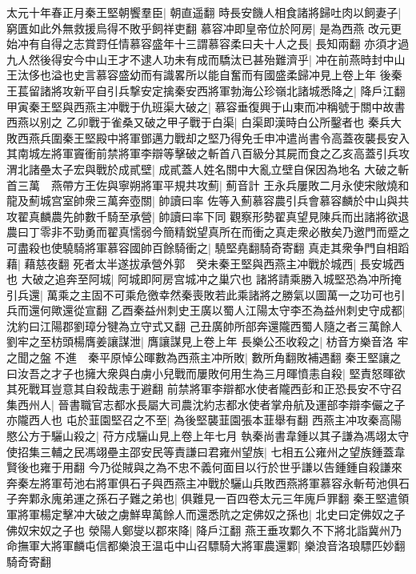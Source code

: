 太元十年春正月秦王堅朝饗羣臣|{
	朝直遥翻}
時長安饑人相食諸將歸吐肉以飼妻子|{
	窮匱如此外無救援烏得不敗乎飼祥吏翻}
慕容冲即皇帝位於阿房|{
	是為西燕}
改元更始冲有自得之志賞罸任情慕容盛年十三謂慕容柔曰夫十人之長|{
	長知兩翻}
亦須才過九人然後得安今中山王才不逮人功未有成而驕汰已甚殆難濟乎|{
	冲在前燕時封中山王汰侈也溢也史言慕容盛幼而有識畧所以能自奮而有國盛柔歸冲見上卷上年}
後秦王萇留諸將攻新平自引兵撃安定擒秦安西將軍勃海公珍嶺北諸城悉降之|{
	降戶江翻}
甲寅秦王堅與西燕主冲戰于仇班渠大破之|{
	慕容垂復興于山東而冲稱號于關中故書西燕以别之}
乙卯戰于雀桑又破之甲子戰于白渠|{
	白渠即漢時白公所鑿者也}
秦兵大敗西燕兵圍秦王堅殿中將軍鄧邁力戰却之堅乃得免壬申冲遣尚書令高蓋夜襲長安入其南城左將軍竇衝前禁將軍李辯等擊破之斬首八百級分其屍而食之乙亥高蓋引兵攻渭北諸壘太子宏與戰於成貳壁|{
	成貳蓋人姓名關中大亂立壁自保因為地名}
大破之斬首三萬　燕帶方王佐與寧朔將軍平規共攻薊|{
	薊音計}
王永兵屢敗二月永使宋敞燒和龍及薊城宫室帥衆三萬奔壺關|{
	帥讀曰率}
佐等入薊慕容農引兵會慕容麟於中山與共攻翟真麟農先帥數千騎至承營|{
	帥讀曰率下同}
觀察形勢翟真望見陳兵而出諸將欲退農曰丁零非不勁勇而翟真懦弱今簡精鋭望真所在而衝之真走衆必散矣乃邀門而蹙之可盡殺也使驍騎將軍慕容國帥百餘騎衝之|{
	驍堅堯翻騎奇寄翻}
真走其衆争門自相蹈藉|{
	藉慈夜翻}
死者太半遂拔承營外郭　癸未秦王堅與西燕主冲戰於城西|{
	長安城西也}
大破之追奔至阿城|{
	阿城即阿房宫城冲之巢穴也}
諸將請乘勝入城堅恐為冲所掩引兵還|{
	萬乘之主固不可乘危徼幸然秦喪敗若此乘諸將之勝氣以圖萬一之功可也引兵而還何歟還從宣翻}
乙酉秦益州刺史王廣以蜀人江陽太守李丕為益州刺史守成都|{
	沈約曰江陽郡劉璋分犍為立守式又翻}
己丑廣帥所部奔還隴西蜀人隨之者三萬餘人　劉牢之至枋頭楊膺姜讓謀泄|{
	膺讓謀見上卷上年}
長樂公丕收殺之|{
	枋音方樂音洛}
牢之聞之盤不進　秦平原悼公暉數為西燕主冲所敗|{
	數所角翻敗補遇翻}
秦王堅讓之曰汝吾之才子也擁大衆與白虜小兒戰而屢敗何用生為三月暉憤恚自殺|{
	堅責怒暉欲其死戰耳豈意其自殺哉恚于避翻}
前禁將軍李辯都水使者隴西彭和正恐長安不守召集西州人|{
	晉書職官志都水長屬大司農沈約志都水使者掌舟航及運部李辯李儼之子亦隴西人也}
屯於韮園堅召之不至|{
	為後堅襲韮園張本韮舉有翻}
西燕主冲攻秦高陽愍公方于驪山殺之|{
	苻方戍驪山見上卷上年七月}
執秦尚書韋鍾以其子謙為馮翊太守使招集三輔之民馮翊壘主邵安民等責謙曰君雍州望族|{
	七相五公雍州之望族鍾蓋韋賢後也雍于用翻}
今乃從賊與之為不忠不義何面目以行於世乎謙以告鍾鍾自殺謙來奔秦左將軍苟池右將軍俱石子與西燕主冲戰於驪山兵敗西燕將軍慕容永斬苟池俱石子奔鄴永廆弟運之孫石子難之弟也|{
	俱難見一百四卷太元三年廆戶罪翻}
秦王堅遣領軍將軍楊定擊冲大破之虜鮮卑萬餘人而還悉阬之定佛奴之孫也|{
	北史曰定佛奴之子佛奴宋奴之子也}
滎陽人鄭燮以郡來降|{
	降戶江翻}
燕王垂攻鄴久不下將北詣冀州乃命撫軍大將軍麟屯信都樂浪王温屯中山召驃騎大將軍農還鄴|{
	樂浪音洛琅驃匹妙翻騎奇寄翻}

